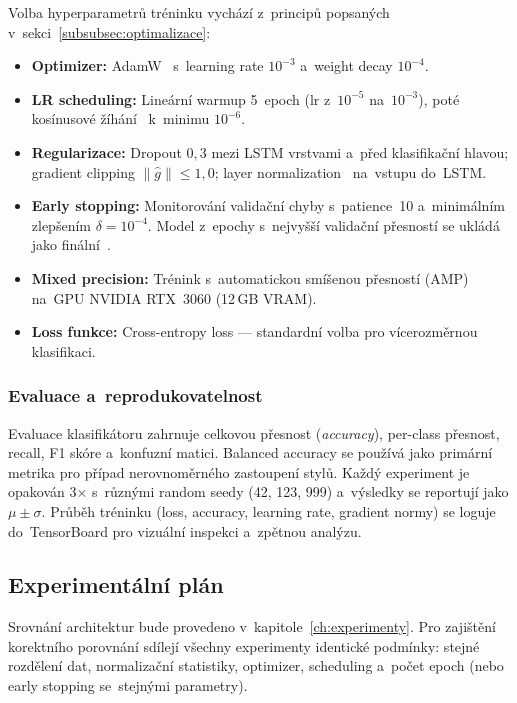 Volba hyperparametrů tréninku vychází z~principů popsaných v~sekci~\ref{subsubsec:optimalizace}:
\begin{itemize}
    \item \textbf{Optimizer:} AdamW~\cite{loshchilov2019adamw} s~learning rate $10^{-3}$ a~weight decay $10^{-4}$.
    \item \textbf{LR scheduling:} Lineární warmup 5~epoch (lr z~$10^{-5}$ na~$10^{-3}$), poté kosínusové žíhání~\cite{loshchilov2017sgdr} k~minimu $10^{-6}$.
    \item \textbf{Regularizace:} Dropout $0{,}3$ mezi LSTM vrstvami a~před klasifikační hlavou; gradient clipping $\|\hat{g}\| \leq 1{,}0$; layer normalization~\cite{ba2016layernorm} na~vstupu do~LSTM.
    \item \textbf{Early stopping:} Monitorování validační chyby s~patience~10 a~minimálním zlepšením $\delta = 10^{-4}$. Model z~epochy s~nejvyšší validační přesností se ukládá jako finální~\cite{prechelt1998earlystopping}.
    \item \textbf{Mixed precision:} Trénink s~automatickou smíšenou přesností (AMP)~\cite{micikevicius2018mixedprecision} na~GPU NVIDIA RTX~3060 (12\,GB VRAM).
    \item \textbf{Loss funkce:} Cross-entropy loss --- standardní volba pro vícerozměrnou klasifikaci.
\end{itemize}

\subsubsection{Evaluace a~reprodukovatelnost}

Evaluace klasifikátoru zahrnuje celkovou přesnost (\textit{accuracy}), per-class přesnost, recall, F1 skóre a~konfuzní matici. Balanced accuracy se používá jako primární metrika pro případ nerovnoměrného zastoupení stylů. Každý experiment je opakován 3$\times$ s~různými random seedy (42, 123, 999) a~výsledky se reportují jako $\mu \pm \sigma$. Průběh tréninku (loss, accuracy, learning rate, gradient normy) se loguje do~TensorBoard pro vizuální inspekci a~zpětnou analýzu.

\subsection{Experimentální plán}
\label{subsec:exp_plan_klasifikace}

Srovnání architektur bude provedeno v~kapitole~\ref{ch:experimenty}. Pro zajištění korektního porovnání sdílejí všechny experimenty identické podmínky: stejné rozdělení dat, normalizační statistiky, optimizer, scheduling a~počet epoch (nebo early stopping se~stejnými parametry).

